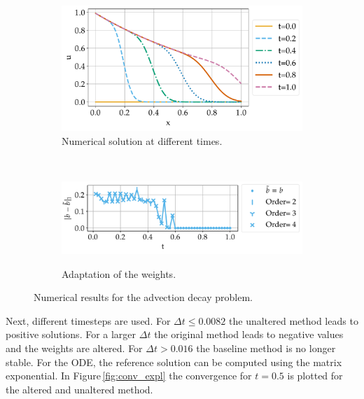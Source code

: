 \documentclass[a4paper]{article}
\numberwithin{equation}{section}
\theoremstyle{plain}
\theoremstyle{definition}
\numberwithin{theorem}{section}
\newcommand{\dt}{{\Delta t}}
\newcommand{\1}{\mathbbm{1}}
\begin{document}
\begin{figure}
\centering
\begin{subfigure}[t]{0.45\textwidth}
\centering
\includegraphics[width=1\textwidth]{plots/Advection_Decay.pdf}
\caption{Numerical solution at different times.}
\label{fig:sol_AdDe}
\end{subfigure}%
~
\begin{subfigure}[t]{0.45\textwidth}
\centering
\includegraphics[width=1\textwidth]{plots/b_Advection_Decay.pdf}\\
\caption{Adaptation of the weights.}
\label{fig:weights_AdDe}
\end{subfigure}
\caption{Numerical results for the advection decay problem.}
\end{figure}


Next, different timesteps are used.
For $\dt \leq 0.0082$ the unaltered method leads to positive solutions. For a larger $\dt$ the original method leads to negative values and the weights are altered. For $\dt >0.016$ the baseline method is no longer stable.
For the ODE, the reference solution can be computed using the matrix exponential. 
In Figure\,\ref{fig:conv_expl} the convergence for $t=0.5$ is plotted for the altered and unaltered method.
\end{document}
